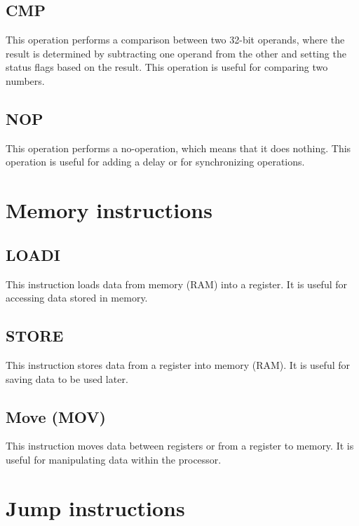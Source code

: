 \documentclass[9pt,a4paper,twoside]{tau}
\begin{document}
        \subsection{CMP}
        This operation performs a comparison between two 32-bit operands, where the result is determined by subtracting one operand from the other and setting the status flags based on the result. This operation is useful for comparing two numbers. 
        \subsection{NOP}
        This operation performs a no-operation, which means that it does nothing. This operation is useful for adding a delay or for synchronizing operations.
    
    
        \section{Memory instructions}

    
        \subsection{LOADI}
        This instruction loads data from memory (RAM) into a register. It is useful for accessing data stored in memory. 
        \subsection{STORE}
        This instruction stores data from a register into memory (RAM). It is useful for saving data to be used later.
        \subsection{Move (MOV)}
        This instruction moves data between registers or from a register to memory. It is useful for manipulating data within the processor.
    
        \section{Jump instructions}
    
\end{document}
